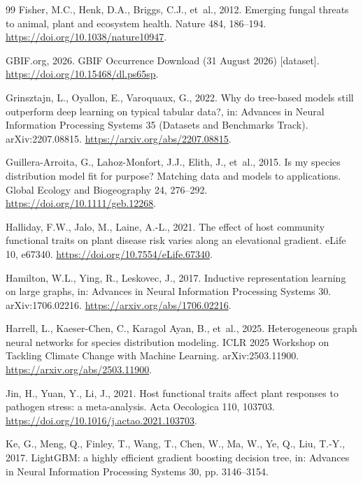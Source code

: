 \documentclass[a4paper,fleqn]{cas-sc}
\begin{document}
\begin{thebibliography}{99}
 Fisher, M.C., Henk, D.A., Briggs, C.J., et~al., 2012. Emerging fungal threats to animal, plant and ecosystem health. Nature 484, 186--194. \url{https://doi.org/10.1038/nature10947}.

 GBIF.org, 2026. GBIF Occurrence Download (31 August 2026) [dataset]. \url{https://doi.org/10.15468/dl.ps65sp}.

 Grinsztajn, L., Oyallon, E., Varoquaux, G., 2022. Why do tree-based models still outperform deep learning on typical tabular data?, in: Advances in Neural Information Processing Systems 35 (Datasets and Benchmarks Track). arXiv:2207.08815. \url{https://arxiv.org/abs/2207.08815}.

 Guillera-Arroita, G., Lahoz-Monfort, J.J., Elith, J., et~al., 2015. Is my species distribution model fit for purpose? Matching data and models to applications. Global Ecology and Biogeography 24, 276--292. \url{https://doi.org/10.1111/geb.12268}.

 Halliday, F.W., Jalo, M., Laine, A.-L., 2021. The effect of host community functional traits on plant disease risk varies along an elevational gradient. eLife 10, e67340. \url{https://doi.org/10.7554/eLife.67340}.

 Hamilton, W.L., Ying, R., Leskovec, J., 2017. Inductive representation learning on large graphs, in: Advances in Neural Information Processing Systems 30. arXiv:1706.02216. \url{https://arxiv.org/abs/1706.02216}.

 Harrell, L., Kaeser-Chen, C., Karagol Ayan, B., et~al., 2025. Heterogeneous graph neural networks for species distribution modeling. ICLR 2025 Workshop on Tackling Climate Change with Machine Learning. arXiv:2503.11900. \url{https://arxiv.org/abs/2503.11900}.

 Jin, H., Yuan, Y., Li, J., 2021. Host functional traits affect plant responses to pathogen stress: a meta-analysis. Acta Oecologica 110, 103703. \url{https://doi.org/10.1016/j.actao.2021.103703}.

 Ke, G., Meng, Q., Finley, T., Wang, T., Chen, W., Ma, W., Ye, Q., Liu, T.-Y., 2017. LightGBM: a highly efficient gradient boosting decision tree, in: Advances in Neural Information Processing Systems 30, pp. 3146--3154.


\end{thebibliography}
\end{document}
